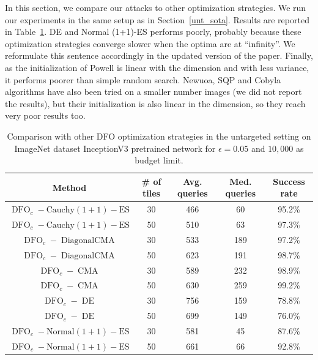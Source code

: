 In this section, we compare our attacks to other optimization strategies. We run our experiments in the same setup as in Section~\ref{unt_sota}. Results are reported in Table~\ref{untargeted_fail}. DE and Normal (1+1)-ES performs poorly, probably because these optimization strategies converge slower when the optima are at ``infinity''.  We reformulate this sentence accordingly in the updated version of the paper. Finally, as the initialization of Powell is linear with the dimension and with less variance, it performs poorer than simple random search. Newuoa, SQP and Cobyla algorithms have also been tried on a smaller number images (we did not report the results), but their initialization is also linear in the dimension, so they reach very poor results too.

\begin{table}[htb]
\caption{Comparison with other DFO optimization strategies in the untargeted setting on ImageNet dataset InceptionV3 pretrained network for $\epsilon=0.05$ and $10,000$ as budget limit.}
\label{untargeted_fail}
\begin{center}
\begin{tabular}{cc|cc|c}
\textbf{Method} & \textbf{\# of tiles} &  \textbf{Avg. queries} &\textbf{Med. queries }& \textbf{Success rate} \\
 \hline

$\operatorname{DFO}_c-\operatorname{Cauchy (1+1)-ES }$ &30&	466& 60	&95.2\%\\
$\operatorname{DFO}_c-\operatorname{Cauchy (1+1)-ES }$ &50&	510&	63	&97.3\% \\
\hline
$\operatorname{DFO}_c-\operatorname{DiagonalCMA}$ &30&	533	&189&	97.2\%\\
$\operatorname{DFO}_c-\operatorname{DiagonalCMA}$ &50&	623	&191&	98.7\%\\
\hline

$\operatorname{DFO}_c-\operatorname{CMA}$& 30&	589	&232	&98.9\%\\
$\operatorname{DFO}_c-\operatorname{CMA}$ & 50&	630	&259&	99.2\%\\

\hline

$\operatorname{DFO}_c-\operatorname{DE}$ & 30&756&159&78.8\%\\
$\operatorname{DFO}_c-\operatorname{DE}$ & 50&699&149	&76.0\%\\
\hline

$\operatorname{DFO}_c-\operatorname{Normal(1+1)-ES}$ &30&	581&	45	&87.6\%\\
$\operatorname{DFO}_c-\operatorname{Normal(1+1)-ES}$ &50&661&66&92.8\%\\
\hline


\end{tabular}
\end{center}
\end{table}
